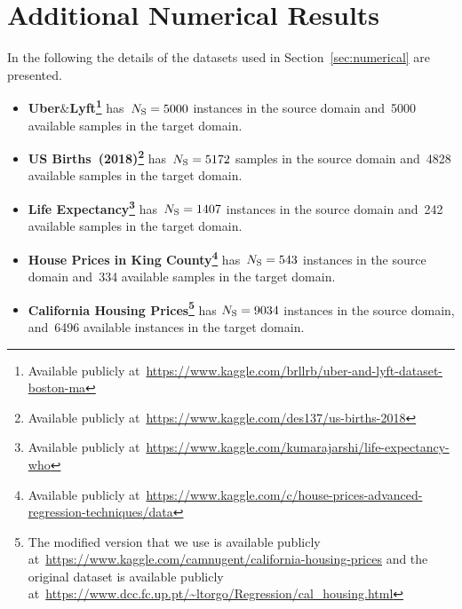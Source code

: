 \documentclass{article}
\begin{document}
\section{Additional Numerical Results}
In the following the details of the datasets used in Section~\ref{sec:numerical} are presented.
    \begin{itemize}[leftmargin = 3mm]
      \item \textbf{Uber$\&$Lyft\footnote{Available publicly at~\url{https://www.kaggle.com/brllrb/uber-and-lyft-dataset-boston-ma}}} has~$N_{\rm S} = 5000$ instances in the source domain and~5000 available samples in the target domain. 
      \item \textbf{US Births~(2018)\footnote{Available publicly at~\url{https://www.kaggle.com/des137/us-births-2018}}} has~$N_{\rm S} = 5172$ samples in the source domain and~4828 available samples in the target domain.
       \item \textbf{Life Expectancy{\footnote{Available publicly at~\url{https://www.kaggle.com/kumarajarshi/life-expectancy-who}}}} has~$N_{\rm S} = 1407$ instances in the source domain and~242 available samples in the target domain.
     \item \textbf{House Prices in King County\footnote{Available publicly at~\url{https://www.kaggle.com/c/house-prices-advanced-regression-techniques/data}}} has~$N_{\rm S} = 543$ instances in the source domain and~334 available samples in the target domain.
         \item \textbf{California Housing Prices\footnote{The modified version that we use is available publicly at~\url{https://www.kaggle.com/camnugent/california-housing-prices} and the original dataset is available publicly at~\url{https://www.dcc.fc.up.pt/~ltorgo/Regression/cal_housing.html}}} has $N_{\rm S} = 9034$ instances in the source domain, and~6496 available instances in the target domain.
    \end{itemize}
\end{document}
